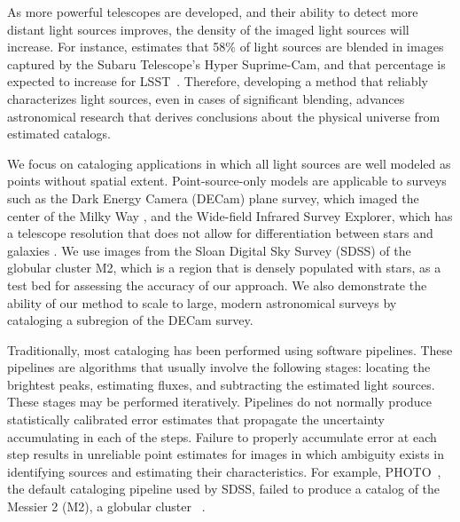 As more powerful telescopes are developed, and their ability to detect more distant light sources improves,
the density of the imaged light sources will increase.
For instance, \cite{bosch2018hyper} estimates that 58\% of light sources are blended in images captured by the
Subaru Telescope’s Hyper Suprime-Cam, and that percentage is expected to increase for LSST~\cite{sanchez2021effects}.
Therefore, developing a method that reliably characterizes light sources, even in cases of significant blending,
advances astronomical research that derives conclusions about the physical universe from estimated catalogs.

We focus on cataloging applications in which all light sources are well modeled as points without spatial extent.
Point-source-only models are applicable to surveys such as the Dark Energy Camera (DECam) plane survey,
which imaged the center of the  Milky Way \citep{Schlafly_2018_DECam}, and
the Wide-field Infrared Survey Explorer,
which has a  telescope resolution that does not allow for differentiation between stars and galaxies \citep{Wright_2010_WISESurvey}.
We use images from the Sloan Digital Sky Survey (SDSS) of the globular cluster M2, which is a region that is densely populated with stars,
as a test bed for assessing the accuracy of our approach.
We also demonstrate the ability of our method to scale to large, modern astronomical surveys
by cataloging a subregion of the DECam survey.

\bigbreak


Traditionally, most cataloging has been performed using software pipelines.
These pipelines are algorithms that usually involve the following stages: locating the brightest peaks, estimating fluxes, and subtracting the estimated light sources.
These stages may be performed iteratively.
Pipelines do not normally produce statistically calibrated error estimates that propagate
the uncertainty accumulating in each of the steps.
Failure to properly accumulate error at each step results in unreliable point estimates
for images in which ambiguity exists in identifying sources and estimating their characteristics.
For example, PHOTO~\citep{lupton2001sdss}, the default cataloging pipeline used by SDSS, failed to produce a catalog of the Messier 2 (M2), a globular cluster ~\citep{Portillo_2017}.

